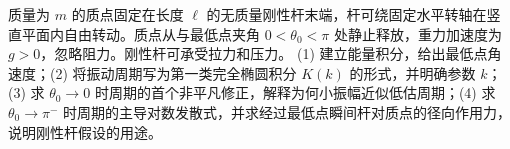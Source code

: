 质量为 \(m\) 的质点固定在长度 \(\ell\) 的无质量刚性杆末端，杆可绕固定水平转轴在竖直平面内自由转动。质点从与最低点夹角 \(0<\theta_0<\pi\) 处静止释放，重力加速度为 \(g>0\)，忽略阻力。刚性杆可承受拉力和压力。
(1) 建立能量积分，给出最低点角速度；(2) 将振动周期写为第一类完全椭圆积分 \(K(k)\) 的形式，并明确参数 \(k\)；(3) 求 \(\theta_0\to0\) 时周期的首个非平凡修正，解释为何小振幅近似低估周期；(4) 求 \(\theta_0\to\pi^-\) 时周期的主导对数发散式，并求经过最低点瞬间杆对质点的径向作用力，说明刚性杆假设的用途。
